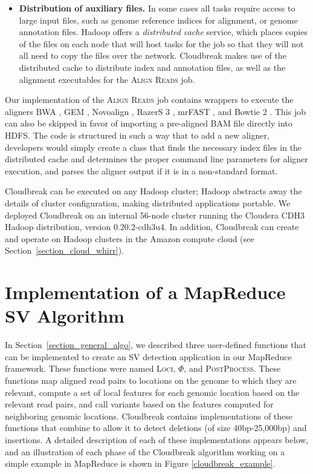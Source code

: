 \begin{itemize}
\item \textbf{Distribution of auxiliary files.} In some cases all tasks require access to large input files, such as genome reference indices for alignment, or genome annotation files. Hadoop offers a \emph{distributed cache} service, which places copies of the files on each node that will host tasks for the job so that they will not all need to copy the files over the network. Cloudbreak makes use of the distributed cache to distribute index and annotation files, as well as the alignment executables for the \textsc{Align Reads} job.
\end{itemize}

Our implementation of the \textsc{Align Reads} job contains wrappers to execute the aligners BWA \cite{Li:2009p836}, GEM \cite{MarcoSola:2012hm}, Novoalign \cite{novoalign}, RazerS 3 \cite{Weese:2012by}, mrFAST \cite{Alkan:2009cr}, and Bowtie 2 \cite{Langmead:2012jh}. This job can also be skipped in favor of importing a pre-aligned BAM file directly into HDFS. The code is structured in such a way that to add a new aligner, developers would simply create a class that finds the necessary index files in the distributed cache and determines the proper command line parameters for aligner execution, and parses the aligner output if it is in a non-standard format.

Cloudbreak can be executed on any Hadoop cluster; Hadoop abstracts away the details of cluster configuration, making distributed applications portable. We deployed Cloudbreak on an internal 56-node cluster running the Cloudera CDH3 Hadoop distribution, version 0.20.2-cdh3u4. In addition, Cloudbreak can create and operate on Hadoop clusters in the Amazon compute cloud (see Section~\ref{section_cloud_whirr}).

\section{Implementation of a MapReduce SV Algorithm}\label{section_user_defined_functions}

In Section~\ref{section_general_algo}, we described three user-defined functions that can be implemented to create an SV detection application in our MapReduce framework. These functions were named \textsc{Loci}, $\Phi$, and \textsc{PostProcess}. These functions map aligned read pairs to locations on the genome to which they are relevant, compute a set of local features for each genomic location based on the relevant read pairs, and call variants based on the features computed for neighboring genomic locations. Cloudbreak contains implementations of these functions that combine to allow it to detect deletions (of size 40bp-25,000bp) and insertions. A detailed description of each of these implementations appears below, and an illustration of each phase of the Cloudbreak algorithm working on a simple example in MapReduce is shown in Figure \ref{cloudbreak_example}.

